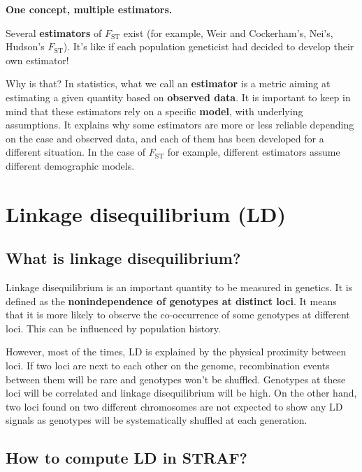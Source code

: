 \documentclass[
]{book}
\begin{document}
\begin{interpretation}
\textbf{One concept, multiple estimators.}

Several \textbf{estimators} of \(F_{\textrm{ST}}\) exist (for example, Weir and Cockerham's, Nei's,
Hudson's \(F_{\textrm{ST}}\)). It's like if each population geneticist had decided
to develop their own estimator!

Why is that? In statistics, what we call an \textbf{estimator} is a metric aiming at estimating
a given quantity based on \textbf{observed data}. It is important to keep in mind that
these estimators rely on a specific \textbf{model}, with underlying assumptions.
It explains why some estimators are more or less reliable depending on the case
and observed data, and each of them has been developed for a different situation.
In the case of \(F_{\textrm{ST}}\) for example, different estimators assume
different demographic models.

\end{interpretation}

\hypertarget{linkage-disequilibrium-ld}{%
\section{Linkage disequilibrium (LD)}\label{linkage-disequilibrium-ld}}

\hypertarget{what-is-linkage-disequilibrium}{%
\subsection{What is linkage disequilibrium?}\label{what-is-linkage-disequilibrium}}

Linkage disequilibrium is an important quantity to be measured in genetics.
It is defined as the \textbf{nonindependence of genotypes at distinct loci}.
It means that it is more likely to observe the co-occurrence of some genotypes
at different loci. This can be influenced by population history.

However, most of the times, LD is explained by the physical proximity between loci. If
two loci are next to each other on the genome, recombination events between them
will be rare and genotypes won't be shuffled. Genotypes at these loci will be correlated
and linkage disequilibrium will be high. On the other hand, two loci found on two different
chromosomes are not expected to show any LD signals as genotypes will be systematically
shuffled at each generation.

\hypertarget{how-to-compute-ld-in-straf}{%
\subsection{How to compute LD in STRAF?}\label{how-to-compute-ld-in-straf}}
\end{document}
